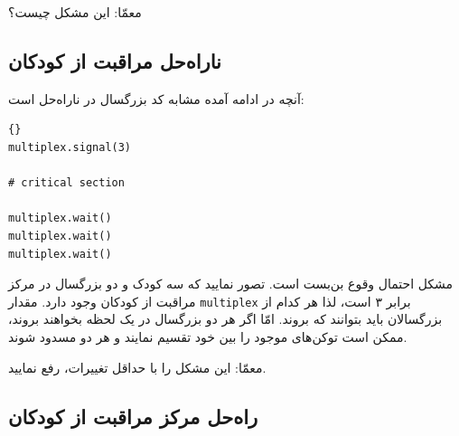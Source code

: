 \documentclass{book}
\newcommand{\clearemptydoublepage}{\newpage\cleardoublepage}
\begin{document}
    معمّا: این مشکل چیست؟


\clearemptydoublepage
\subsection {ناراه‌حل مراقبت از کودکان}

    آنچه در ادامه آمده مشابه کد بزرگسال در ناراه‌حل  است: 

\begin{latin}
\begin{lstlisting}[title=\rl{ناراه‌حل مراقبت از کودکان (بزرگسال)}]{}
multiplex.signal(3)

# critical section

multiplex.wait()
multiplex.wait()
multiplex.wait()
\end{lstlisting}
\end{latin}

    مشکل احتمال وقوع بن‌بست است. تصور نمایید که سه کودک و دو بزرگسال در مرکز مراقبت از کودکان وجود دارد. 
    مقدار {\tt multiplex} برابر ۳ است، لذا هر کدام از بزرگسالان باید بتوانند که بروند. 
    امّا اگر هر دو بزرگسال در یک لحظه بخواهند بروند، ممکن است توکن‌های موجود را بین خود تقسیم نمایند و هر دو مسدود شوند. 

    معمّا: این مشکل را با حداقل تغییرات، رفع نمایید. 


\clearemptydoublepage
    \subsection{راه‌حل مرکز مراقبت از کودکان}        
\end{document}
